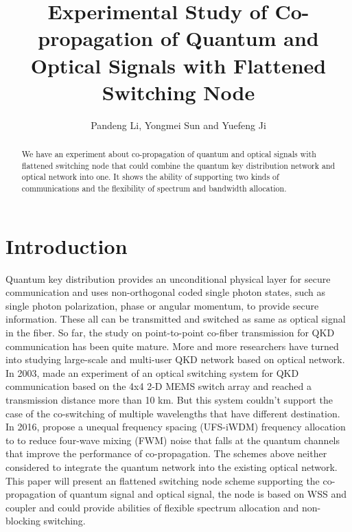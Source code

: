 \documentclass[letterpaper,10pt]{article}
\begin{document}
\title{Experimental Study of Co-propagation of Quantum and Optical Signals with Flattened Switching Node}
\author{Pandeng Li, Yongmei Sun and Yuefeng Ji}
\address{State Key Laboratory of Information Photonics and Optical Communications, School of Information and Telecommunication Engineering, BUPT Beijing, China, 100876}

\begin{abstract}
We have an experiment about co-propagation of quantum and optical signals with flattened switching node that could combine the quantum key distribution network and optical network into one. It shows the ability of supporting two kinds of communications and the flexibility of spectrum and bandwidth allocation.
\end{abstract}

\section{Introduction}

Quantum key distribution provides an unconditional physical layer for secure communication and uses non-orthogonal coded single photon states, such as single photon polarization, phase or angular momentum, to provide secure information. These all can be transmitted and switched as same as optical signal in the fiber. So far, the study on point-to-point co-fiber transmission for QKD communication has been quite mature. More and more researchers have turned into studying large-scale and multi-user QKD network based on optical network. In 2003, \cite{ToliverPaul} made an experiment of an optical switching system for QKD communication based on the 4x4 2-D MEMS switch array and reached a transmission distance more than 10 km. But this system couldn't support the case of the co-switching of multiple wavelengths that have different destination. In 2016, \cite{YongmeiSun} propose a unequal frequency spacing (UFS-iWDM) frequency allocation to to reduce four-wave mixing (FWM) noise that falls at the quantum channels that improve the performance of co-propagation. The schemes above neither considered to integrate the quantum network into the existing optical network. This paper will present an flattened switching node scheme supporting the co-propagation of quantum signal and optical signal, the node is based on WSS and coupler and could provide abilities of flexible spectrum allocation and non-blocking switching.
\end{document}
